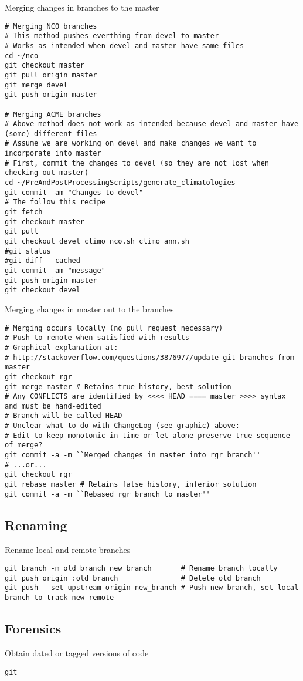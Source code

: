 \documentclass[12pt,twoside]{article}
\begin{document}
Merging changes in branches to the master
\begin{verbatim}
# Merging NCO branches
# This method pushes everthing from devel to master
# Works as intended when devel and master have same files
cd ~/nco
git checkout master
git pull origin master
git merge devel
git push origin master

# Merging ACME branches
# Above method does not work as intended because devel and master have (some) different files
# Assume we are working on devel and make changes we want to incorporate into master
# First, commit the changes to devel (so they are not lost when checking out master)
cd ~/PreAndPostProcessingScripts/generate_climatologies
git commit -am "Changes to devel"
# The follow this recipe
git fetch
git checkout master
git pull
git checkout devel climo_nco.sh climo_ann.sh
#git status
#git diff --cached
git commit -am "message"
git push origin master
git checkout devel
\end{verbatim}

Merging changes in master out to the branches
\begin{verbatim}
# Merging occurs locally (no pull request necessary)
# Push to remote when satisfied with results
# Graphical explanation at:
# http://stackoverflow.com/questions/3876977/update-git-branches-from-master
git checkout rgr
git merge master # Retains true history, best solution
# Any CONFLICTS are identified by <<<< HEAD ==== master >>>> syntax and must be hand-edited
# Branch will be called HEAD
# Unclear what to do with ChangeLog (see graphic) above:
# Edit to keep monotonic in time or let-alone preserve true sequence of merge?
git commit -a -m ``Merged changes in master into rgr branch''
# ...or...
git checkout rgr
git rebase master # Retains false history, inferior solution
git commit -a -m ``Rebased rgr branch to master''
\end{verbatim}

\subsection{Renaming}\label{sxn:git_rnm}

Rename local and remote branches
\begin{verbatim}
git branch -m old_branch new_branch       # Rename branch locally    
git push origin :old_branch               # Delete old branch
git push --set-upstream origin new_branch # Push new branch, set local branch to track new remote
\end{verbatim}

\subsection{Forensics}\label{sxn:git_rnm}

Obtain dated or tagged versions of code
\begin{verbatim}
git 
\end{verbatim}

%
%
\end{document}
